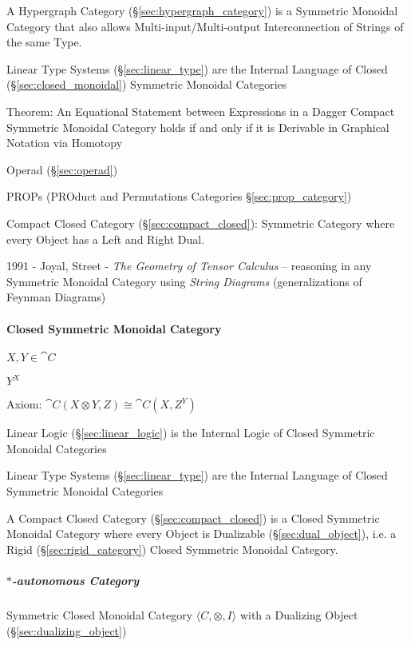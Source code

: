 A Hypergraph Category (\S\ref{sec:hypergraph_category}) is a Symmetric
Monoidal Category that also allows Multi-input/Multi-output
Interconnection of Strings of the same Type.

Linear Type Systems (\S\ref{sec:linear_type}) are the Internal
Language of Closed (\S\ref{sec:closed_monoidal}) Symmetric Monoidal
Categories

Theorem: An Equational Statement between Expressions in a Dagger
Compact Symmetric Monoidal Category holds if and only if it is
Derivable in Graphical Notation via Homotopy %

Operad (\S\ref{sec:operad})

\fist PROPs (PROduct and Permutations Categories \S\ref{sec:prop_category})

Compact Closed Category (\S\ref{sec:compact_closed}): Symmetric
Category where every Object has a Left and Right Dual.

1991 - Joyal, Street - \emph{The Geometry of Tensor Calculus} -- reasoning in
any Symmetric Monoidal Category using \emph{String Diagrams} (generalizations
of Feynman Diagrams)



\paragraph{Closed Symmetric Monoidal Category}\hfill
\label{sec:closed_symmetric_monoidal}

$X, Y \in \cat{C}$

$Y^X$

Axiom: $\cat{C}(X \otimes Y, Z) \cong \cat{C}(X, Z^Y)$

Linear Logic (\S\ref{sec:linear_logic}) is the Internal Logic of
Closed Symmetric Monoidal Categories

Linear Type Systems (\S\ref{sec:linear_type}) are the Internal
Language of Closed Symmetric Monoidal Categories

A Compact Closed Category (\S\ref{sec:compact_closed}) is a Closed
Symmetric Monoidal Category where every Object is Dualizable
(\S\ref{sec:dual_object}), i.e. a Rigid (\S\ref{sec:rigid_category})
Closed Symmetric Monoidal Category.



\subparagraph{$*$-autonomous Category}\label{sec:star_autonomous}\hfill

Symmetric Closed Monoidal Category $\langle C, \otimes, I \rangle$
with a Dualizing Object (\S\ref{sec:dualizing_object})

